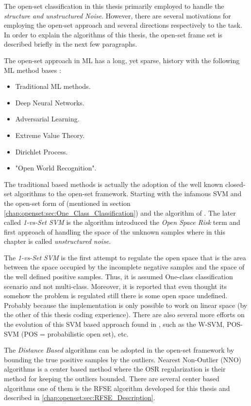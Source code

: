 The open-set classification in this thesis primarily employed to handle the \textit{structure and unstructured Noise}. However, there are several motivations for employing the open-set approach and several directions respectively to the task. In order to explain the algorithms of this thesis, the open-set frame set is described briefly in the next few paragraphs.

The open-set approach in ML has a long, yet sparse, history with the following ML method bases \parencite{geng2018recent}:

\begin{itemize}
    \item Traditional ML methods.
    \item Deep Neural Networks.
    \item Adversarial Learning.
    \item Extreme Value Theory.
    \item Dirichlet Process.
    \item "Open World Recognition".
\end{itemize}

The traditional based methods is actually the adoption of the well known closed-set algorithms to the open-set framework. Starting with the infamous SVM and the open-set form of \parencite{manevitz2002one} (mentioned in section \ref{chap:openset:sec:One_Class_Classification}) and the algorithm of \parencite{scheirer2013toward}. The later called \textit{1-vs-Set SVM} is the algorithm introduced the \textit{Open Space Risk} term and first approach of handling the space of the unknown samples where in this chapter is called \textit{unstructured noise}. 

The \textit{1-vs-Set SVM} is the first attempt to regulate the open space that is the area between the space occupied by the incomplete negative samples and the space of the well defined positive samples. Thus, it is assumed One-class classification scenario and not multi-class. Moreover, it is reported that even thought its somehow the problem is regulated still there is some open space undefined. Probably because the implementation is only possible to work on linear space (by the other of this thesis coding experience). There are also several more efforts on the evolution of this SVM based approach found in \parencite{geng2018recent}, such as the W-SVM, POS-SVM (POS = probabilistic open set), etc.

The \textit{Distance Based} algorithms can be adopted in the open-set framework by bounding the true positive samples by the outliers. Nearest Non-Outlier (NNO) algorithms is a center based method where the OSR regularization is their method for keeping the outliers bounded. There are several center based algorithms one of them is the RFSE algorithm developed for this thesis and described in \ref{chap:openset:sec:RFSE_Description}. 

